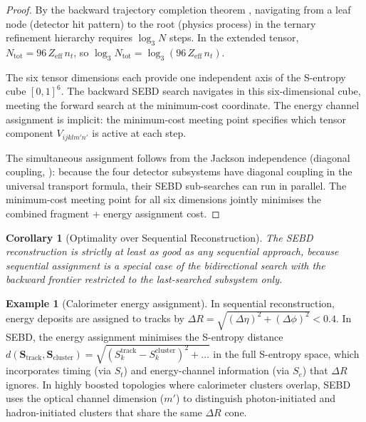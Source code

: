 \documentclass[twocolumn,10pt,a4paper]{article}
\theoremstyle{thmstyle}
\newtheorem{corollary}[theorem]{Corollary}
\theoremstyle{definition}
\newtheorem{example}[theorem]{Example}
\theoremstyle{remark}
\newcommand{\Sk}{S_{k}}
\newcommand{\St}{S_{t}}
\newcommand{\Se}{S_{e}}
\begin{document}
\begin{proof}
By the backward trajectory completion theorem
\citep{companion:trajectory}, navigating from a leaf node (detector hit
pattern) to the root (physics process) in the ternary refinement hierarchy
requires $\log_3 N$ steps.  In the extended tensor, $N_\text{tot} =
96\,Z_\text{eff}\,n_t$, so $\log_3 N_\text{tot} =
\log_3(96\,Z_\text{eff}\,n_t)$.

The six tensor dimensions each provide one independent axis of the S-entropy
cube $[0,1]^6$.  The backward SEBD search navigates in this six-dimensional
cube, meeting the forward search at the minimum-cost coordinate.  The
energy channel assignment is implicit: the minimum-cost meeting point
specifies which tensor component $V_{ijklm'n'}$ is active at each step.

The simultaneous assignment follows from the Jackson independence (diagonal
coupling, \citealt{companion:qnd}): because the four detector subsystems
have diagonal coupling in the universal transport formula, their SEBD
sub-searches can run in parallel.  The minimum-cost meeting point for
all six dimensions jointly minimises the combined fragment + energy
assignment cost.
\end{proof}

\begin{corollary}[Optimality over Sequential Reconstruction]
The SEBD reconstruction is strictly at least as good as any sequential
approach, because sequential assignment is a special case of the
bidirectional search with the backward frontier restricted to the
last-searched subsystem only.
\end{corollary}

\begin{example}[Calorimeter energy assignment]
In sequential reconstruction, energy deposits are assigned to tracks by
$\Delta R = \sqrt{(\Delta\eta)^2 + (\Delta\phi)^2} < 0.4$.
In SEBD, the energy assignment minimises the S-entropy distance
$d(\mathbf{S}_\text{track}, \mathbf{S}_\text{cluster}) =
\sqrt{(\Sk^\text{track} - \Sk^\text{cluster})^2 + \ldots}$
in the full S-entropy space, which incorporates timing (via $\St$)
and energy-channel information (via $\Se$) that $\Delta R$ ignores.
In highly boosted topologies where calorimeter clusters overlap,
SEBD uses the optical channel dimension ($m'$) to distinguish
photon-initiated and hadron-initiated clusters that share the same
$\Delta R$ cone.
\end{example}

\end{document}

